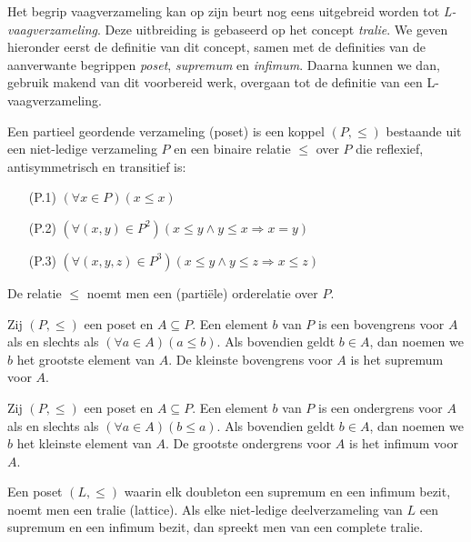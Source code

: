 Het begrip vaagverzameling kan op zijn beurt nog eens uitgebreid worden tot 
\emph{L-vaagverzameling}. Deze uitbreiding is gebaseerd op het concept \emph{tralie}. We geven
hieronder eerst de definitie van dit concept, samen met de definities van de aanverwante
begrippen \emph{poset}, \emph{supremum} en \emph{infimum}. Daarna kunnen we dan, gebruik
makend van dit voorbereid werk, overgaan tot de definitie van een L-vaagverzameling. 
\begin{definitie}
Een partieel geordende verzameling (poset) is een koppel $(P,\le)$ bestaande uit een niet-ledige
verzameling $P$ en een binaire relatie $\le$ over $P$ die reflexief, antisymmetrisch en 
transitief is:
\begin{itemize}
  \item[(P.1)] $(\forall x \in P)(x \le x)$
  \item[(P.2)] $(\forall (x,y) \in P^2)(x \le y \land y \le x \Rightarrow x = y)$
  \item[(P.3)] $(\forall (x,y,z) \in P^3)(x \le y \land y \le z \Rightarrow x \le z)$
\end{itemize}
De relatie $\le$ noemt men een (parti\"ele) orderelatie over $P$.
\end{definitie} 
\begin{definitie}
Zij $(P,\le)$ een poset en $A \subseteq P$. Een element $b$ van $P$ is een bovengrens voor $A$
als en slechts als $(\forall a \in A)(a \le b)$. Als bovendien geldt $b \in A$, dan noemen
we $b$ het grootste element van $A$. De kleinste bovengrens voor $A$ is het
supremum voor $A$.
\end{definitie}
\begin{definitie}
Zij $(P,\le)$ een poset en $A \subseteq P$. Een element $b$ van $P$ is een ondergrens voor $A$
als en slechts als $(\forall a \in A)(b \le a)$. Als bovendien geldt $b \in A$, dan noemen
we $b$ het kleinste element van $A$. De grootste ondergrens voor $A$ is het
infimum voor $A$.
\end{definitie}
\begin{definitie}
Een poset $(L,\le)$ waarin elk doubleton een supremum en een infimum bezit, noemt men een tralie 
(lattice). Als elke niet-ledige deelverzameling van $L$
een supremum en een infimum bezit, dan spreekt men van een complete tralie.
\end{definitie}

